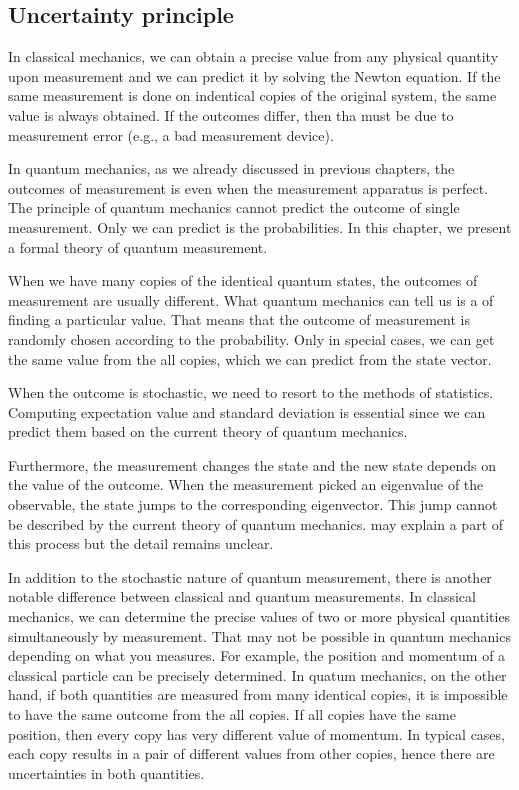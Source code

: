 \documentclass[letterpaper,10pt,english]{jupyterBook}
\begin{document}
\subsection{Uncertainty principle}
\label{\detokenize{qmsummary/measurement:uncertainty-principle}}
\sphinxAtStartPar
In classical mechanics, we can obtain a precise value from any  physical quantity  upon measurement and we can predict it by solving the Newton equation.  If the same measurement is done on indentical copies of the original system, the same value is always obtained. If the outcomes differ, then tha must be due to measurement error (e.g., a bad measurement device).

\sphinxAtStartPar
In quantum mechanics, as we already discussed in previous chapters, the outcomes of measurement is  even when the measurement apparatus is perfect. The principle of quantum mechanics cannot predict the outcome of single measurement. Only we can predict is the probabilities.   In this chapter, we present a formal theory of quantum measurement.

\sphinxAtStartPar
When we have many copies of the identical quantum states, the outcomes of measurement are usually different.  What quantum mechanics can tell us is a  of finding a particular value.  That means that the outcome of  measurement is randomly chosen according to the probability.  Only in special cases, we can get the same value from the all copies,  which we can predict from the state vector.

\sphinxAtStartPar
When the outcome is stochastic, we need to resort to the methods of statistics. Computing expectation value and standard deviation is essential since we can predict them based on the current theory of quantum mechanics.

\sphinxAtStartPar
Furthermore, the measurement changes the state and the new state depends on the value of the outcome.  When the measurement picked an eigenvalue of the observable, the state jumps to the corresponding eigenvector. This jump cannot be described by the current theory of quantum mechanics.   may explain a part of this process but the detail remains unclear.

\sphinxAtStartPar
In addition to the stochastic nature of quantum measurement, there is another notable difference between classical and quantum measurements.  In classical mechanics,  we can determine the precise values of two or more physical quantities simultaneously by measurement. That may not be possible in quantum mechanics depending on what you measures.  For example, the position and momentum of a classical particle can be precisely determined. In quatum mechanics, on the other hand, if both quantities are measured from many identical copies, it is impossible to have the same outcome from the all copies.  If all copies have the same position, then every copy has very different value of momentum.  In typical cases, each copy results in a pair of different values from other copies, hence there are uncertainties in both quantities.
\end{document}
